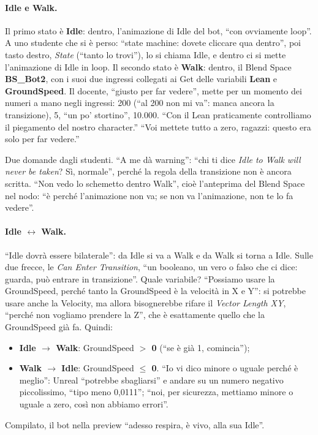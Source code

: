 \paragraph{Idle e Walk.} Il primo stato è \textbf{Idle}: dentro, l'animazione di Idle del
bot, ``con ovviamente loop''. A uno studente che si è perso: ``state machine: dovete
cliccare qua dentro'', poi tasto destro, \emph{State} (``tanto lo trovi''), lo si chiama
Idle, e dentro ci si mette l'animazione di Idle in loop. Il secondo stato è \textbf{Walk}:
dentro, il Blend Space \textbf{BS\_Bot2}, con i suoi due ingressi collegati ai Get delle
variabili \textbf{Lean} e \textbf{GroundSpeed}. Il docente, ``giusto per far vedere'', mette
per un momento dei numeri a mano negli ingressi: 200 (``al 200 non mi va'': manca ancora
la transizione), 5, ``un po' stortino'', 10.000. ``Con il Lean praticamente controlliamo
il piegamento del nostro character.'' ``Voi mettete tutto a zero, ragazzi: questo era solo
per far vedere.''

Due domande dagli studenti. ``A me dà warning'': ``chi ti dice \emph{Idle to Walk will
never be taken}? Sì, normale'', perché la regola della transizione non è ancora scritta.
``Non vedo lo schemetto dentro Walk'', cioè l'anteprima del Blend Space nel nodo: ``è
perché l'animazione non va; se non va l'animazione, non te lo fa vedere''.

\paragraph{Idle $\leftrightarrow$ Walk.} ``Idle dovrà essere bilaterale'': da Idle si va a
Walk e da Walk si torna a Idle. Sulle due frecce, le \emph{Can Enter Transition}, ``un
booleano, un vero o falso che ci dice: guarda, può entrare in transizione''. Quale
variabile? ``Possiamo usare la GroundSpeed, perché tanto la GroundSpeed è la velocità in
X e Y'': si potrebbe usare anche la Velocity, ma allora bisognerebbe rifare il
\emph{Vector Length XY}, ``perché non vogliamo prendere la Z'', che è esattamente quello
che la GroundSpeed già fa. Quindi:
\begin{itemize}
  \item \textbf{Idle $\rightarrow$ Walk}: GroundSpeed \textbf{$>$ 0} (``se è già 1,
        comincia'');
  \item \textbf{Walk $\rightarrow$ Idle}: GroundSpeed \textbf{$\le$ 0}. ``Io vi dico minore
        o uguale perché è meglio'': Unreal ``potrebbe sbagliarsi'' e andare su un numero
        negativo piccolissimo, ``tipo meno 0,0111''; ``noi, per sicurezza, mettiamo minore
        o uguale a zero, così non abbiamo errori''.
\end{itemize}
Compilato, il bot nella preview ``adesso respira, è vivo, alla sua Idle''.

